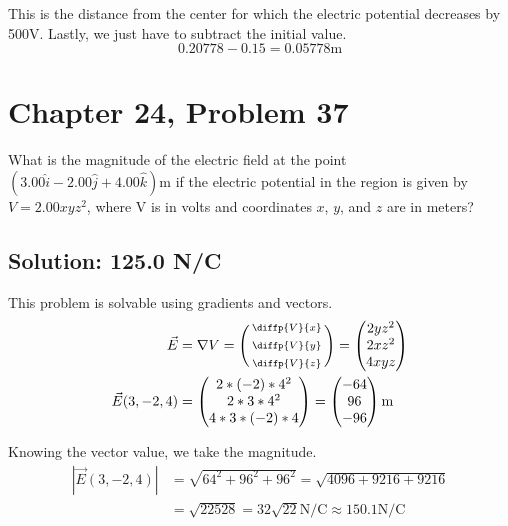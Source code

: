 \documentclass[12pt]{article}
\begin{document}
This is the distance from the center for which the electric potential decreases by 500V.
Lastly, we just have to subtract the initial value.
\begin{equation*}
    0.20778 - 0.15 = \boxed{0.05778 \unit{\meter}}
\end{equation*}

\pagebreak
\section{Chapter 24, Problem 37}
What is the magnitude of the electric field at the point $(3.00\hat{i} - 2.00\hat{j} + 4.00\hat{k}) \unit{\meter}$ if the electric potential in the region is given by $V = 2.00xyz^2$, where V is in volts and coordinates $x$, $y$, and $z$ are in meters?

\subsection*{Solution: 125.0 N/C}
This problem is solvable using gradients and vectors.
\begin{align*}
    \vec{E} &=  \nabla V
        =   \left(\begin{smallmatrix} \diffp{V}{x}\\ \\ \diffp{V}{y}\\ \\ \diffp{V}{z} \end{smallmatrix}\right)
        =   \begin{pmatrix} 2yz^2\\ 2xz^2\\ 4xyz \end{pmatrix}\\
    \vec{E}(3, -2, 4)   &=  \begin{pmatrix} 2*(-2)*4^2\\ 2*3*4^2\\ 4*3*(-2)*4 \end{pmatrix}
        =   \begin{pmatrix} -64 \\ 96 \\ -96 \end{pmatrix} \unit{\meter}
\end{align*}

Knowing the vector value, we take the magnitude.
\begin{align*}
    \left|\vec{E}(3, -2, 4)\right|  &=  \sqrt{64^2 + 96^2 + 96^2}
        =   \sqrt{4096 + 9216 + 9216}\\
        &=  \sqrt{22528}
        =   \boxed{32 \sqrt{22} \unit{\newton/\coulomb} \approx 150.1 \unit{\newton/\coulomb}}
\end{align*}
\end{document}
